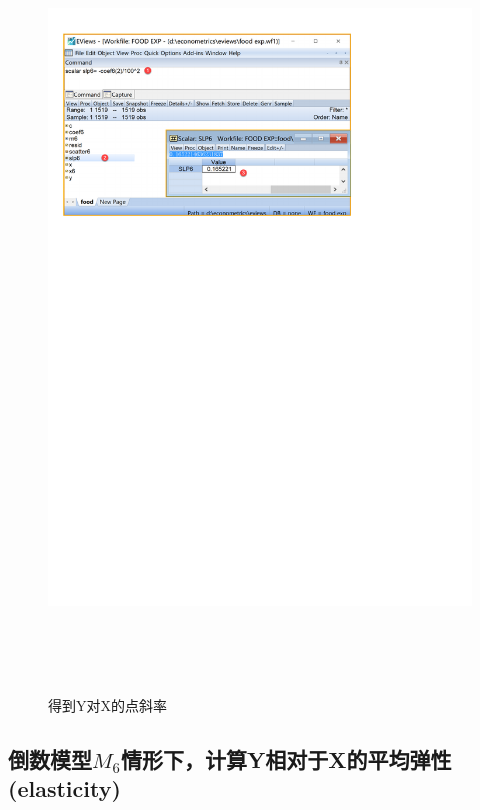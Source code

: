 \documentclass[12pt,(landscape,a4paper),(portrait,a4paper)]{article}
\begin{document}
\begin{figure}

{\centering \includegraphics[width=24.24in,height=8in]{picture/lab3-model-function/slope6} 

}

\caption{得到Y对X的点斜率}\label{fig:slope6}
\end{figure}

\hypertarget{m_6yxelasticity}{%
\subsection{\texorpdfstring{倒数模型\(M_6\)情形下，计算Y相对于X的平均弹性(elasticity)}{倒数模型M\_6情形下，计算Y相对于X的平均弹性(elasticity)}}\label{m_6yxelasticity}}
\end{document}
